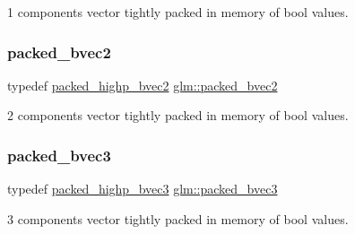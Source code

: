 1 components vector tightly packed in memory of bool values. 

\mbox{\label{group__gtc__type__aligned_gabbb5ab4c9a0de67e04e2f183c0bff576}} 
\subsubsection{\texorpdfstring{packed\+\_\+bvec2}{packed\_bvec2}}
{\footnotesize\ttfamily typedef \mbox{\hyperlink{group__gtc__type__aligned_ga8059c50785881a9f30b9a8e3ff5daf83}{packed\+\_\+highp\+\_\+bvec2}} \mbox{\hyperlink{group__gtc__type__aligned_gabbb5ab4c9a0de67e04e2f183c0bff576}{glm\+::packed\+\_\+bvec2}}}



2 components vector tightly packed in memory of bool values. 

\mbox{\label{group__gtc__type__aligned_gae53d997456f6336eab2450117b11163e}} 
\subsubsection{\texorpdfstring{packed\+\_\+bvec3}{packed\_bvec3}}
{\footnotesize\ttfamily typedef \mbox{\hyperlink{group__gtc__type__aligned_gafad47eaff82deab03a1e8d82d2dbd046}{packed\+\_\+highp\+\_\+bvec3}} \mbox{\hyperlink{group__gtc__type__aligned_gae53d997456f6336eab2450117b11163e}{glm\+::packed\+\_\+bvec3}}}



3 components vector tightly packed in memory of bool values. 

\mbox{\label{group__gtc__type__aligned_ga27837cfec1a5b6d6ae23961f93431403}} 
